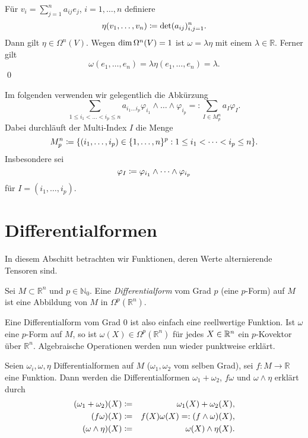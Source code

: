 \documentclass[a4paper,twoside,DIV15,BCOR12mm]{scrbook}
\begin{document}
\bigskip

 Für $v_{i} = \sum_{j=1}^{n} a_{ij}e_{j}$, 
$i = 1,\dots,n$ definiere
\[ \eta(v_{1},\dots,v_{n}) \da  {\rm det} (a_{ij})_{i,j=1}^{n}. \]
Dann gilt $\eta \in \Omega^{n}(V)$. Wegen ${\rm dim}\, \Omega^{n}(V) = 
1$ ist $\omega = \lambda \eta$ mit einem $\lambda \in {\mathbb R}$. 
Ferner gilt
\[ \omega(e_{1},\dots,e_{n}) = \lambda \eta(e_{1},\dots,e_{n}) = 
\lambda.\]  
\qed\\

\bigskip

 Im folgenden verwenden wir gelegentlich 
die Abkürzung
\[ \sum_{1 \le i_{1} < \dots < i_{p} \le n} a_{i_{1}\dots i_{p}} 
\varphi_{i_1} \wedge \dots \wedge \varphi_{i_p} =: \sum_{I \in 
M_{p}^{n}} a_{I} \varphi_{I}. \]
Dabei durchläuft der Multi-Index $I$ die Menge
\[ M_{p}^{n} \da  \{(i_{1},\dots,i_{p}) \in \{1,\dots,n\}^{p}: 1 \le 
i_{1} < \dots < i_{p} \le n\}. \]
Insbesondere sei
\[ \varphi_{I} \da  \varphi_{i_1} \wedge \dots \wedge \varphi_{i_p} \]
für $I = (i_{1},\dots,i_{p})$.



\section{Differentialformen}


In diesem Abschitt betrachten wir Funktionen, 
deren Werte alternierende Tensoren sind.

\bigskip

 Sei $M \subset {\mathbb R}^{n}$ und $p \in {\mathbb N}_{0}$. 
Eine {\em Differentialform} vom Grad $p$ (eine $p$-Form) auf $M$ 
ist eine Abbildung von $M$ in $\Omega^{p}({\mathbb R}^{n})$.

\bigskip

\noindent
Eine Differentialform vom Grad 0 ist also einfach eine reellwertige Funktion. 
Ist $\omega$ eine $p$-Form auf $M$, so ist $\omega(X) \in \Omega^{p}
({\mathbb R}^{n})$ für jedes $X\in\mathbb{R}^n$
 ein $p$-Kovektor über ${\mathbb R}^{n}$. Algebraische Operationen werden nun wieder 
 punktweise erklärt.
 
\bigskip

 Seien $\omega_{i},\omega,\eta$ Differentialformen auf $M$ ($\omega_{1},\omega_{2}$ vom selben Grad), sei $f: M \to {\mathbb R}$ eine Funktion. 
Dann werden die Differentialformen $\omega_{1} + \omega_{2}$, $f\omega$ und $\omega \wedge \eta$ erklärt durch
\begin{eqnarray*}
(\omega_{1} + \omega_{2})(X) & \da  & \omega_{1}(X) + \omega_{2}(X), \\
(f\omega) (X) & \da  & f(X)\omega(X) =: (f \wedge \omega)(X), \\
(\omega \wedge \eta)(X) & \da  & \omega(X) \wedge \eta(X). 
\end{eqnarray*}
\end{document}
